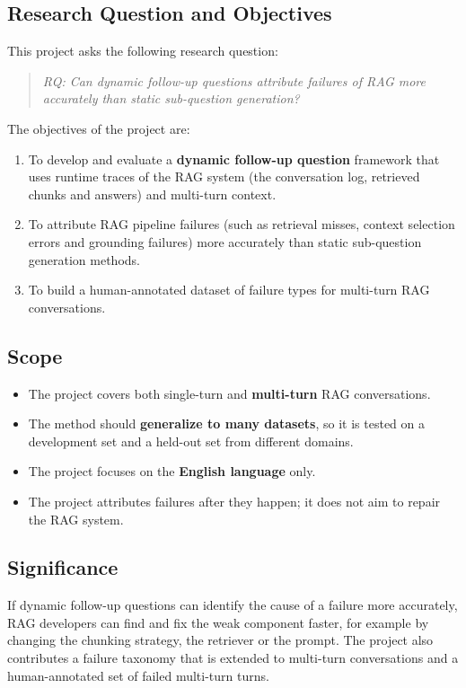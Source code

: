 \documentclass[11pt]{article}
\begin{document}
\subsection{Research Question and Objectives}
This project asks the following research question:
\begin{quote}
\emph{RQ: Can dynamic follow-up questions attribute failures of RAG more accurately than static sub-question generation?}
\end{quote}
The objectives of the project are:
\begin{enumerate}
  \item To develop and evaluate a \textbf{dynamic follow-up question} framework that uses runtime traces of the RAG system (the conversation log, retrieved chunks and answers) and multi-turn context.
  \item To attribute RAG pipeline failures (such as retrieval misses, context selection errors and grounding failures) more accurately than static sub-question generation methods.
  \item To build a human-annotated dataset of failure types for multi-turn RAG conversations.
\end{enumerate}

\subsection{Scope}
\begin{itemize}
  \item The project covers both single-turn and \textbf{multi-turn} RAG conversations.
  \item The method should \textbf{generalize to many datasets}, so it is tested on a development set and a held-out set from different domains.
  \item The project focuses on the \textbf{English language} only.
  \item The project attributes failures after they happen; it does not aim to repair the RAG system.
\end{itemize}

\subsection{Significance}
If dynamic follow-up questions can identify the cause of a failure more accurately, RAG developers can find and fix the weak component faster, for example by changing the chunking strategy, the retriever or the prompt. The project also contributes a failure taxonomy that is extended to multi-turn conversations and a human-annotated set of failed multi-turn turns.
\end{document}
